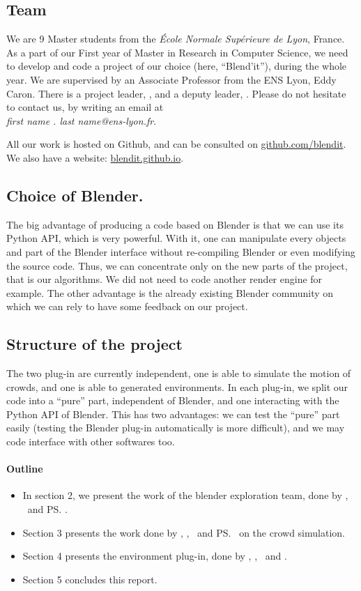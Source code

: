 \subsection{Team}

We are 9 Master students from the \textit{École Normale Supérieure de
Lyon}, France. As a part of our First year of Master in Research in
Computer Science, we need to develop and code a project of our choice
(here, ``Blend'it''), during the whole year. We are supervised by an
Associate Professor from the ENS Lyon, Eddy Caron. There is a project
leader, \me, and a deputy leader, \mr. Please do not hesitate to
contact us, by writing an email at \\
\textit{first name . last name@ens-lyon.fr}.


All our work is hosted on Github, and can be consulted on
\url{github.com/blendit}. We also have a website:
\url{blendit.github.io}.


\subsection{Choice of Blender.}

The big advantage of producing a code based on Blender is that we can
use its Python API, which is very powerful. With it, one can
manipulate every objects and part of the Blender interface without
re-compiling Blender or even modifying the source code. Thus, we can
concentrate only on the new parts of the project, that is our algorithms. We
did not need to code another render engine for example.  The other
advantage is the already existing Blender community on which
we can rely to have some feedback on our project.


\subsection{Structure of the project}

The two plug-in are currently independent, one is able to simulate the
motion of crowds, and one is able to generated environments. In each
plug-in, we split our code into a ``pure'' part, independent of
Blender, and one interacting with the Python API of Blender. This has
two advantages: we can test the ``pure'' part easily (testing the
Blender plug-in automatically is more difficult), and we may code
interface with other softwares too.



\paragraph{Outline}

\begin{itemize}
  \item In section 2, we present the work of the blender exploration team, done by \mr, \me\ and \ps.
  \item Section 3 presents the work done by \dl, \vl,
\js\ and \ps \ on the crowd simulation.
 \item Section 4 presents the environment
plug-in, done by \bb, \gc, \mr\ and \me.
\item Section 5 concludes this report.
\end{itemize}

  
